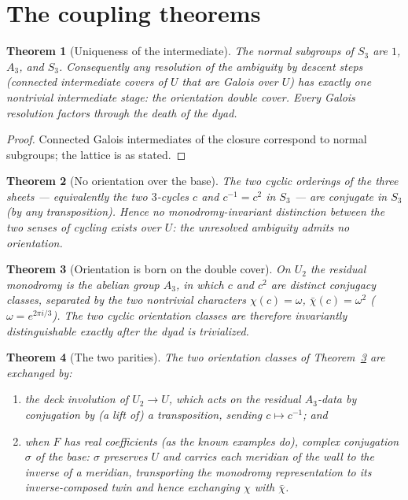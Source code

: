 \documentclass[11pt,reqno]{amsart}
\numberwithin{equation}{section}
\newtheorem{theorem}{Theorem}[section]
\theoremstyle{remark}
\begin{document}
\section{The coupling theorems}\label{sec:coupling}

\begin{theorem}[Uniqueness of the intermediate]\label{thm:T1}
The normal subgroups of $S_3$ are $1$, $A_3$, and $S_3$. Consequently any
resolution of the ambiguity by descent steps (connected intermediate covers
of $U$ that are Galois over $U$) has exactly one nontrivial intermediate
stage: the orientation double cover. Every Galois resolution factors
through the death of the dyad.
\end{theorem}

\begin{proof}
Connected Galois intermediates of the closure correspond to normal
subgroups; the lattice is as stated.
\end{proof}

\begin{theorem}[No orientation over the base]\label{thm:T2}
The two cyclic orderings of the three sheets --- equivalently the two
$3$-cycles $c$ and $c^{-1}=c^2$ in $S_3$ --- are conjugate in $S_3$ (by any
transposition). Hence no monodromy-invariant distinction between the two
senses of cycling exists over $U$: the unresolved ambiguity admits no
orientation.
\end{theorem}

\begin{theorem}[Orientation is born on the double cover]\label{thm:T3}
On $U_2$ the residual monodromy is the abelian group $A_3$, in which $c$
and $c^{2}$ are distinct conjugacy classes, separated by the two nontrivial
characters $\chi(c)=\omega$, $\bar\chi(c)=\omega^{2}$
\textup{(}$\omega=e^{2\pi i/3}$\textup{)}. The two cyclic orientation
classes are therefore invariantly distinguishable exactly after the dyad is
trivialized.
\end{theorem}

\begin{theorem}[The two parities]\label{thm:T3prime}
The two orientation classes of Theorem~\ref{thm:T3} are exchanged by:
\begin{enumerate}[label=\textup{(\roman*)}]
\item the deck involution of $U_2\to U$, which acts on the residual
$A_3$-data by conjugation by \textup{(}a lift of\textup{)} a transposition,
sending $c\mapsto c^{-1}$; and
\item when $F$ has real coefficients \textup{(}as the known examples
do\textup{)}, complex conjugation $\sigma$ of the base: $\sigma$ preserves
$U$ and carries each meridian of the wall to the inverse of a meridian,
transporting the monodromy representation to its inverse-composed twin and
hence exchanging $\chi$ with $\bar\chi$.
\end{enumerate}
\end{theorem}
\end{document}

